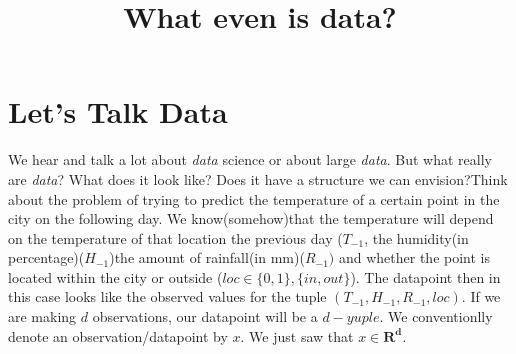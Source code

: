 \documentclass[]{article}
\title{What even is data?}
\author{}
\begin{document}
\maketitle
\section{Let's Talk Data}
We hear and talk a lot about \textit{data} science or about large \textit{data}. But what really are \textit{ data}? What does it look like? Does it have a structure we can envision?Think about the problem of trying to predict the temperature of a certain point in the city on the following day. We know(somehow)that the temperature will depend on the temperature of that location the previous day ($T_{-1}$, the humidity(in percentage)($H_{-1}$)the amount of rainfall(in mm)($R_{-1})$ and whether the point is located within the city or outside ($loc\in \{0,1\},\{in,out\} $). The datapoint then in this case looks like the observed values for the tuple $( T_{-1},H_{-1},{R_{-1},loc})$.
If we are making $d$ observations, our datapoint will be a $d-yuple$. We conventionlly denote an observation/datapoint by $x$. We just saw that $x \in \mathbf{R^d}$.
\end{document}
